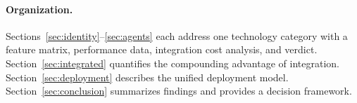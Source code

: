 \paragraph{Organization.} Sections~\ref{sec:identity}--\ref{sec:agents} each address one technology category with a feature matrix, performance data, integration cost analysis, and verdict. Section~\ref{sec:integrated} quantifies the compounding advantage of integration. Section~\ref{sec:deployment} describes the unified deployment model. Section~\ref{sec:conclusion} summarizes findings and provides a decision framework.

